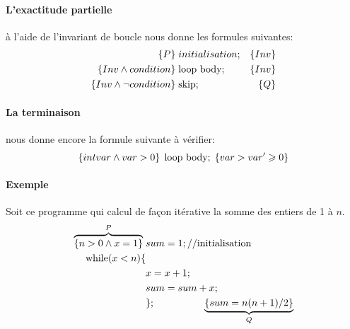 \documentclass[12pt]{article}
\begin{document}
\paragraph*{L'exactitude partielle} à l'aide de l'invariant de boucle
nous donne les formules suivantes:
\begin{align*}
    \left\{P\right\}\; &initialisation; &\left\{Inv\right\}\\
    \left\{Inv \wedge condition\right\}\; &\textnormal{loop body}; &\left\{Inv\right\}\\
    \left\{Inv \wedge \lnot condition\right\}\; &\textnormal{skip}; &\left\{Q\right\}
\end{align*}

\paragraph*{La terminaison} nous donne encore la formule suivante à 
vérifier:
\begin{equation*}
    \left\{int var \wedge var > 0\right\}\; \textnormal{loop body};\; \left\{var > var'\geqslant 0\right\}
\end{equation*}

\paragraph*{Exemple} 
Soit ce programme qui calcul de façon itérative la somme des entiers de 1 à $n$.
\begin{align*}
    \overbrace{\left\{n>0 \wedge x = 1\right\}}^{P}\; &sum = 1; \textnormal{//initialisation}\\
    \textnormal{while}(x<n) \{\\
                            &x = x + 1;\\
                            &sum = sum + x;\\
                            &\}; \quad \qquad \qquad \underbrace{\left\{sum = n(n+1)/2\right\}}_{Q}
\end{align*}
\end{document}

